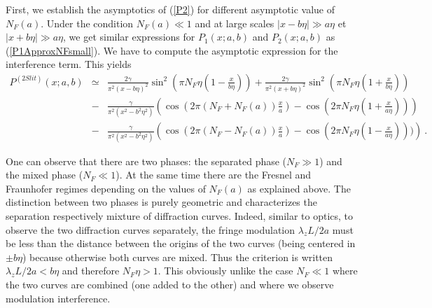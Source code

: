 \documentclass[12pt,aps,prb,preprint]{revtex4-1}   %
\begin{document}
First, we establish the asymptotics of (\ref{P2}) for different
asymptotic value of $N_F(a)$. Under the condition $N_F(a)\ll 1$
and at large scales $|x-b\eta|\gg a\eta$ et $|x+b\eta|\gg
a\eta$, we get  similar expressions for $P_1(x;a,b)$ and
$P_2(x;a,b)$ as (\ref{P1ApproxNFsmall}). We have to compute the
asymptotic expression for the interference term. This yields
\begin{eqnarray}\label{P2slApprox}
P^{(2 Slit)}(x;a,b)&\simeq&\frac{2\gamma}{\pi^2 (x-b\eta)^2}
\sin^2{\left(\pi N_F\eta(1-\frac{x}{b\eta})\right)}
+\frac{2\gamma}{\pi^2 (x+b\eta)^2} \sin^2{\left(\pi
N_F\eta(1+\frac{x}{b\eta})\right)}
{}\nonumber\\{}&-&\frac{\gamma}{\pi^2 (x^2-b^2\eta^2)}
\left(\cos{(2\pi (N_F+N_F(a))\frac{x}{a})}-\cos{(2\pi
N_F\eta(1+\frac{x}{a\eta}))}\right)
{}\nonumber\\{}&-&\frac{\gamma}{\pi^2 (x^2-b^2\eta^2)}
\left(\cos{(2\pi (N_F-N_F(a))\frac{x}{a})}-\cos{(2\pi
N_F\eta(1-\frac{x}{a\eta}))}) \right)\ .
\end{eqnarray}


One can observe that there are two phases: the
separated phase ($N_F\gg 1$) and the mixed phase ($N_F\ll 1$). At
the same time there are the Fresnel and Fraunhofer regimes
depending on the values of $N_F(a)$ as explained above. The
distinction between two phases is purely geometric and
characterizes the separation respectively mixture of diffraction
curves. Indeed, similar to optics, to observe the two diffraction
curves separately, the fringe modulation $\lambda_z L/2a$ must be
less than the distance between the origins of the two curves
(being centered in $\pm b\eta$) because otherwise both curves are
mixed. Thus the criterion is written $ \lambda_z L/2a < b\eta $
and therefore $N_F\eta > 1$. This obviously unlike the case $ N_F
\ll 1 $ where the two curves are combined (one added to the other)
and where we observe modulation interference. %
\end{document}
